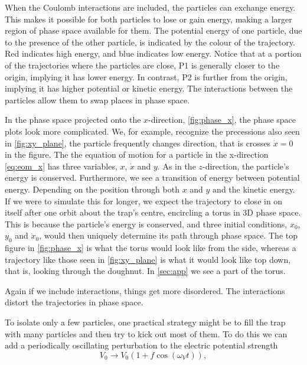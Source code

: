 When the Coulomb interactions are included, the particles can exchange energy. This makes it possible for both particles to lose or gain energy, making
a larger region of phase space available for them.
The potential energy of one particle, due to the presence of the other particle, is indicated by the colour of the trajectory. Red indicates high energy, and blue indicates low energy. Notice that at
a portion of the trajectories where the particles are close, P1 is generally closer to the
origin, implying it has lower energy. In contrast, P2 is further from the origin, implying it has higher potential or kinetic energy. The interactions between the particles allow them to swap places
in phase space.

In the phase space projected onto the $x$-direction, \autoref{fig:phase_x}, the phase space plots look more complicated.
We, for example, recognize the precessions also seen in \autoref{fig:xy_plane}, the particle frequently changes direction, that is
crosses $\dot{x}=0$ in the figure.
The the equation of motion for a particle in the x-direction \autoref{eq:eom_x} has three variables, $x$, $\dot{x}$ and $y$.
As in the $z$-direction, the particle's energy is conserved. Furthermore, we see a transition of energy between potential energy. 
Depending on the position through both $x$ and $y$ and the kinetic energy. If we were to simulate this for longer, we expect
the trajectory to close in on itself after one orbit about the trap's centre, encircling a torus in 3D phase space. This is because the particle's energy is conserved, and three initial conditions, $x_0$, $y_0$ and $\dot{x}_0$, would then uniquely determine its path through phase space. \cite{leinaas:klasmek}
The top figure in \autoref{fig:phase_x} is what the torus would look like from the side, whereas a trajectory like those seen in \autoref{fig:xy_plane} is what it would look like top down, that is, looking through the doughnut.
In \autoref{sec:app} we see a part of the torus.

Again if we include interactions, things get more disordered. The interactions distort the trajectories in phase space.


To isolate only a few particles, one practical strategy might be to fill the
trap with many particles and then try to kick out most of them. To do this
we can add a periodically oscillating perturbation to the electric potential strength
\begin{equation}
  V_0 \rightarrow V_0(1 + f\cos (\omega_V t)),
  \end{equation}

